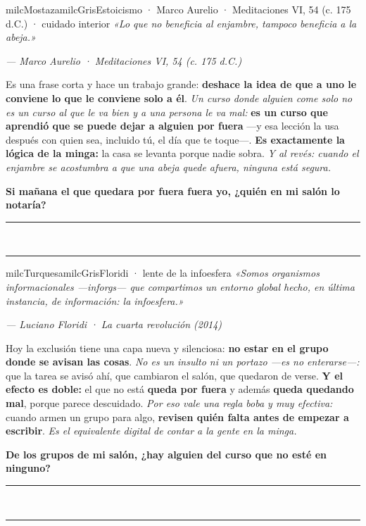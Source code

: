 \documentclass[11pt,letterpaper]{article}
\newcommand{\linead}[1]{\noindent\color{milcLinea}\rule{#1}{0.5pt}\color{milcNegro}}
\begin{document}
\begin{softbox}{milcMostaza}{milcGris}{Estoicismo · Marco Aurelio · Meditaciones VI, 54 (c. 175 d.C.) · cuidado interior}
\textit{«Lo que no beneficia al enjambre, tampoco beneficia a la abeja.»}

{\footnotesize\itshape\color{milcNegro!70}--- Marco Aurelio · Meditaciones VI, 54 (c. 175 d.C.)}

Es una frase corta y hace un trabajo grande: \textbf{deshace la idea de que a uno le conviene lo que le conviene solo a él}. \emph{Un curso donde alguien come solo no es un curso al que le va bien y a una persona le va mal:} \textbf{es un curso que aprendió que se puede dejar a alguien por fuera} ---y esa lección la usa después con quien sea, incluido tú, el día que te toque---. \textbf{Es exactamente la lógica de la minga:} la casa se levanta porque nadie sobra. \emph{Y al revés: cuando el enjambre se acostumbra a que una abeja quede afuera, ninguna está segura.}

\textbf{Si mañana el que quedara por fuera fuera yo, ¿quién en mi salón lo notaría?}
\end{softbox}
\linead{\linewidth}\\[1mm]
\linead{\linewidth}

\begin{softbox}{milcTurquesa}{milcGris}{Floridi · lente de la infoesfera}
\textit{«Somos organismos informacionales ---inforgs--- que compartimos un entorno global hecho, en última instancia, de información: la infoesfera.»}

{\footnotesize\itshape\color{milcNegro!70}--- Luciano Floridi · La cuarta revolución (2014)}

Hoy la exclusión tiene una capa nueva y silenciosa: \textbf{no estar en el grupo donde se avisan las cosas}. \emph{No es un insulto ni un portazo ---es no enterarse---:} que la tarea se avisó ahí, que cambiaron el salón, que quedaron de verse. \textbf{Y el efecto es doble:} el que no está \textbf{queda por fuera} y además \textbf{queda quedando mal}, porque parece descuidado. \emph{Por eso vale una regla boba y muy efectiva:} cuando armen un grupo para algo, \textbf{revisen quién falta antes de empezar a escribir}. \emph{Es el equivalente digital de contar a la gente en la minga.}

\textbf{De los grupos de mi salón, ¿hay alguien del curso que no esté en ninguno?}
\end{softbox}
\linead{\linewidth}\\[1mm]
\linead{\linewidth}
\end{document}
